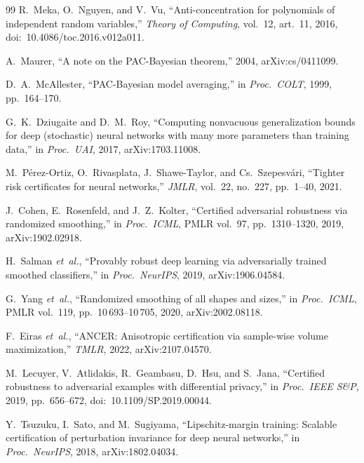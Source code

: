 \documentclass[journal,10pt]{IEEEtran}
\theoremstyle{definition}
\theoremstyle{remark}
\begin{document}
\begin{thebibliography}{99}
 R.~Meka, O.~Nguyen, and V.~Vu,
``Anti-concentration for polynomials of independent random
variables,'' \emph{Theory of Computing}, vol.~12, art.~11, 2016,
doi:~10.4086/toc.2016.v012a011.

 A.~Maurer, ``A note on the PAC-Bayesian
theorem,'' 2004, arXiv:cs/0411099.

 D.~A.~McAllester, ``PAC-Bayesian
model averaging,'' in \emph{Proc.\ COLT}, 1999, pp.~164--170.

 G.~K.~Dziugaite and D.~M.~Roy,
``Computing nonvacuous generalization bounds for deep (stochastic)
neural networks with many more parameters than training data,''
in \emph{Proc.\ UAI}, 2017, arXiv:1703.11008.

 M.~P\'erez-Ortiz, O.~Rivasplata,
J.~Shawe-Taylor, and Cs.~Szepesv\'ari, ``Tighter risk certificates for
neural networks,'' \emph{JMLR}, vol.~22, no.~227, pp.~1--40, 2021.

 J.~Cohen, E.~Rosenfeld, and J.~Z.~Kolter,
``Certified adversarial robustness via randomized smoothing,''
in \emph{Proc.\ ICML}, PMLR vol.~97, pp.~1310--1320, 2019,
arXiv:1902.02918.

 H.~Salman \textit{et~al.}, ``Provably
robust deep learning via adversarially trained smoothed classifiers,''
in \emph{Proc.\ NeurIPS}, 2019, arXiv:1906.04584.

 G.~Yang \textit{et~al.}, ``Randomized
smoothing of all shapes and sizes,'' in \emph{Proc.\ ICML},
PMLR vol.~119, pp.~10\,693--10\,705, 2020, arXiv:2002.08118.

 F.~Eiras \textit{et~al.}, ``ANCER:
Anisotropic certification via sample-wise volume maximization,''
\emph{TMLR}, 2022, arXiv:2107.04570.

 M.~Lecuyer, V.~Atlidakis, R.~Geambasu,
D.~Hsu, and S.~Jana, ``Certified robustness to adversarial examples
with differential privacy,'' in \emph{Proc.\ IEEE S\&P}, 2019,
pp.~656--672, doi:~10.1109/SP.2019.00044.

 Y.~Tsuzuku, I.~Sato, and M.~Sugiyama,
``Lipschitz-margin training: Scalable certification of perturbation
invariance for deep neural networks,'' in \emph{Proc.\ NeurIPS}, 2018,
arXiv:1802.04034.


\end{thebibliography}
\end{document}
